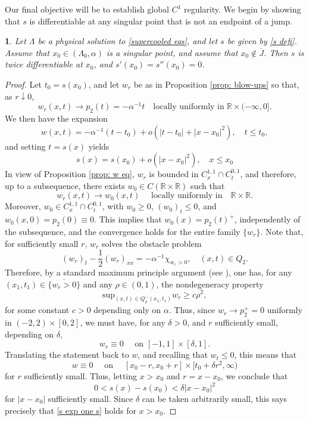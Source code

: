 \documentclass{article}
\numberwithin{equation}{section}
\numberwithin{figure}{section}
\theoremstyle{plain}
\theoremstyle{plain}
\theoremstyle{plain}
\theoremstyle{plain}
\newtheorem{lem}[thm]{\protect\lemmaname}
\theoremstyle{definition}
\theoremstyle{remark}
\def\R{{\mathbb{R}}}
\providecommand{\lemmaname}{Lemma}
\begin{document}
Our final objective will be to establish global $C^1$ regularity. We begin by showing that $s$ is differentiable at any singular point that is not an endpoint of a jump.
\begin{lem} \label{lem: singu point diff} Let $\Lambda$ be a physical solution to \eqref{supercooled eqs}, and let $s$ be given by \eqref{s defi}. Assume that $x_0\in (\Lambda_0,\alpha)$ is a singular point, and assume that $x_0 \notin \overline{J}$. Then $s$ is twice differentiable at $x_0$, and $s'(x_0)=s''(x_0)=0$.   
\end{lem}
\begin{proof} Let $t_0=s(x_0)$, and let $w_r$ be as in Proposition \ref{prop: blow-ups} so that, as $r\downarrow 0$,
\[w_r(x,t) \to p_2(t)=-\alpha^{-1}t \quad \text{locally uniformly in} \; \R \times (-\infty,0].\]
We then have the expansion
\[w(x,t)=-\alpha^{-1}(t-t_0) +o(|t-t_0|+|x-x_0|^2), \quad t\leq t_0,\]
and setting $t=s(x)$ yields
\begin{equation} \label{s exp one s}
  s(x)= s(x_0) + o(|x-x_0|^2), \quad x\leq x_0
\end{equation}
In view of Proposition \ref{prop: w eq}, $w_r$ is bounded in $C^{1,1}_x \cap C^{0,1}_t$, and therefore, up to a subsequence, there exists $w_0 \in C(\R\times \R)$ such that
\[w_r(x,t) \to w_0(x,t) \quad \text{ locally uniformly in}\quad \R \times \R.\]
Moreover, $w_0 \in C^{1,1}_x\cap C^{0,1}_t$, with $w_0\geq 0$, $(w_0)_t\leq 0$, and $w_0(x,0)=p_2(0)\equiv0$. This implies that $w_0(x)=p_2(t)^+$, independently of the subsequence, and the convergence holds for the entire family $\{w_r\}$. Note that, for sufficiently small $r$, $w_r$ solves the  obstacle problem
\[(w_r)_t-\frac{1}{2}(w_r)_{xx}=-\alpha^{-1}\chi_{w_r>0}, \quad (x,t)\in Q_2.\]
Therefore, by a standard maximum principle argument (see \cite[Lem. 5.1]{CafPetSha}), one has, for any $(x_1,t_1)\in \overline{ \{w_r>0\}}$ and any $\rho \in (0,1)$, the nondegeneracy property
\[\text{sup}_{(x,t)\in Q_\rho^-(x_1,t_1)}w_r\geq c \rho^2,\]
for some constant $c>0$ depending only on $\alpha$. Thus, since $w_r \to p_2^+=0$ uniformly in $(-2,2)\times[0,2]$, we must have, for any $\delta>0$, and $r$ sufficiently small, depending on $\delta$,
\[w_r \equiv 0  \quad \text{ on } [-1,1] \times [\delta,1].\]
Translating the statement back to $w$, and recalling that $w_t \leq 0$, this means that
\[w \equiv 0 \quad \text{ on } \quad  [x_0-r,x_0+r] \times [t_0+\delta r^2,\infty)\]
for $r$ sufficiently small. Thus, letting $x>x_0$ and $r=x-x_0$, we conclude that 
\[0<s(x)-s(x_0)<\delta |x-x_0|^2\]
for $|x-x_0|$ sufficiently small. Since $\delta$ can be taken arbitrarily small, this says precisely that \eqref{s exp one s} holds for $x>x_0$.
\end{proof}
\end{document}
